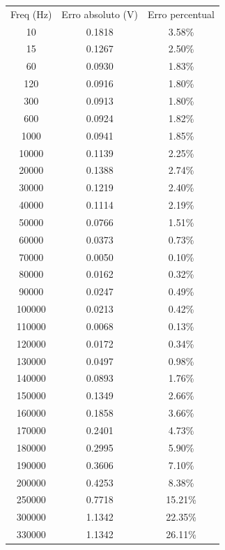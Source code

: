 \documentclass[12pt,twoside, a4paper, twocolumn]{article}
\begin{document}
\begin{center}
    \begin{tabular}{ |c|c|c| }
        \hline
        Freq (Hz) & Erro absoluto (V) & Erro percentual \\
        10        & 0.1818            & 3.58\%          \\
        15        & 0.1267            & 2.50\%          \\
        60        & 0.0930            & 1.83\%          \\
        120       & 0.0916            & 1.80\%          \\
        300       & 0.0913            & 1.80\%          \\
        600       & 0.0924            & 1.82\%          \\
        1000      & 0.0941            & 1.85\%          \\
        10000     & 0.1139            & 2.25\%          \\
        20000     & 0.1388            & 2.74\%          \\
        30000     & 0.1219            & 2.40\%          \\
        40000     & 0.1114            & 2.19\%          \\
        50000     & 0.0766            & 1.51\%          \\
        60000     & 0.0373            & 0.73\%          \\
        70000     & 0.0050            & 0.10\%          \\
        80000     & 0.0162            & 0.32\%          \\
        90000     & 0.0247            & 0.49\%          \\
        100000    & 0.0213            & 0.42\%          \\
        110000    & 0.0068            & 0.13\%          \\
        120000    & 0.0172            & 0.34\%          \\
        130000    & 0.0497            & 0.98\%          \\
        140000    & 0.0893            & 1.76\%          \\
        150000    & 0.1349            & 2.66\%          \\
        160000    & 0.1858            & 3.66\%          \\
        170000    & 0.2401            & 4.73\%          \\
        180000    & 0.2995            & 5.90\%          \\
        190000    & 0.3606            & 7.10\%          \\
        200000    & 0.4253            & 8.38\%          \\
        250000    & 0.7718            & 15.21\%         \\
        300000    & 1.1342            & 22.35\%         \\
        330000    & 1.1342            & 26.11\%         \\
        \hline
    \end{tabular}
\end{center}
\end{document}
